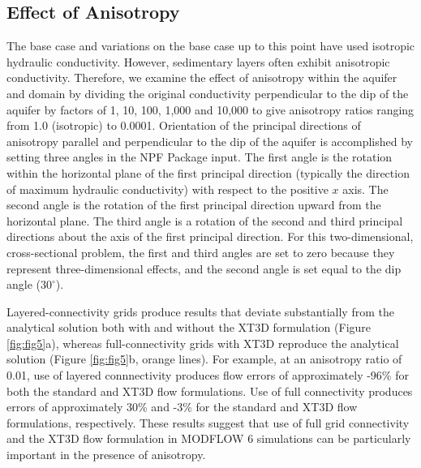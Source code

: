 \documentclass{article}
\begin{document}
\subsection*{Effect of Anisotropy}

The base case and variations on the base case up to this point have used isotropic hydraulic conductivity. However, sedimentary layers often exhibit anisotropic conductivity. Therefore, we examine the effect of anisotropy within the aquifer and domain by dividing the original conductivity perpendicular to the dip of the aquifer by factors of 1, 10, 100, 1,000 and 10,000 to give anisotropy ratios ranging from 1.0 (isotropic) to 0.0001. Orientation of the principal directions of anisotropy parallel and perpendicular to the dip of the aquifer is accomplished by setting three angles in the NPF Package input. The first angle is the rotation within the horizontal plane of the first principal direction (typically the direction of maximum hydraulic conductivity) with respect to the positive $x$ axis. The second angle is the rotation of the first principal direction upward from the horizontal plane. The third angle is a rotation of the second and third principal directions about the axis of the first principal direction. For this two-dimensional, cross-sectional problem, the first and third angles are set to zero because they represent three-dimensional effects, and the second angle is set equal to the dip angle ($30^{\circ}$).

Layered-connectivity grids produce results that deviate substantially from the analytical solution both with and without the XT3D formulation (Figure \ref{fig:fig5}a), whereas full-connectivity grids with XT3D reproduce the analytical solution (Figure \ref{fig:fig5}b, orange lines). For example, at an anisotropy ratio of 0.01, use of layered connnectivity produces flow errors of approximately -96\% for both the standard and XT3D flow formulations. Use of full connectivity produces errors of approximately 30\% and -3\% for the standard and XT3D flow formulations, respectively. These results suggest that use of full grid connectivity and the XT3D flow formulation in MODFLOW 6 simulations can be particularly important in the presence of anisotropy.
\end{document}
